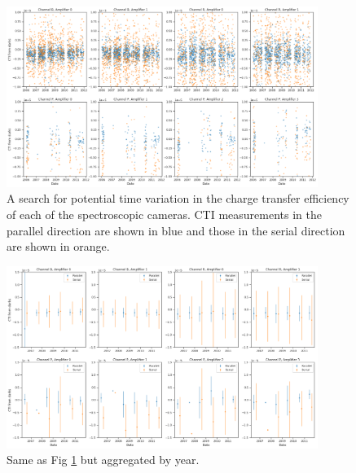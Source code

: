 \begin{figure}
    \centering
    \includegraphics[width=0.9\textwidth]{figures/cte/time_variation.png}
    \caption{A search for potential time variation in the charge transfer efficiency of each of the spectroscopic cameras. CTI measurements in the parallel direction are shown in blue and those in the serial direction are shown in orange.}
    \label{fig:time_variation}
\end{figure}

\begin{figure}
    \centering
    \includegraphics[width=0.9\textwidth]{figures/cte/time_variation_by_year.png}
    \caption{Same as Fig \ref{fig:time_variation} but aggregated by year.}
    \label{fig:time_variation_binned}
\end{figure}

